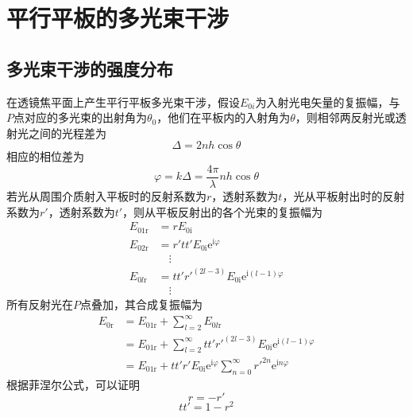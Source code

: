 \documentclass[cn,10pt,chinesefont=founder,math=mtpro2,cite=super,toc=onecol,twoside,openany]{elegantbook}
\begin{document}
\section{平行平板的多光束干涉}

\subsection{多光束干涉的强度分布}
在透镜焦平面上产生平行平板多光束干涉，假设$E_{0i}$为入射光电矢量的复振幅，与$P$点对应的多光束的出射角为$\theta_0$，他们在平板内的入射角为$\theta$，则相邻两反射光或透射光之间的光程差为
\begin{equation}
\varDelta=2nh\cos\theta
\end{equation}
相应的相位差为
\begin{equation}
\varphi=k\varDelta=\frac{4\pi}{\lambda}nh\cos\theta
\label{eq:phase-difference-between-two-beams}
\end{equation}
若光从周围介质射入平板时的反射系数为$r$，透射系数为$t$，光从平板射出时的反射系数为$r'$，透射系数为$t'$，则从平板反射出的各个光束的复振幅为
\begin{equation}
\begin{aligned}
E_{01\mathrm{r}}&=rE_{0\mathrm{i}}\\
E_{02\mathrm{r}}&=r'tt'E_{0\mathrm{i}}\mathrm{e}^{\mathrm{i}\varphi}\\
&\quad\vdots\\
E_{0l\mathrm{r}}&=tt'r'^{(2l-3)}E_{0\mathrm{i}}\mathrm{e}^{\mathrm{i}(l-1)\varphi}\\
&\quad\vdots
\end{aligned}
\end{equation}
所有反射光在$P$点叠加，其合成复振幅为
\begin{equation}
\begin{aligned}
E_{0\mathrm{r}}&=E_{01\mathrm{r}}+\sum_{l=2}^{\infty}E_{0l\mathrm{r}}\\
&=E_{01\mathrm{r}}+\sum_{l=2}^{\infty}tt'r'^{(2l-3)}E_{0\mathrm{i}}\mathrm{e}^{\mathrm{i}(l-1)\varphi}\\
&=E_{01\mathrm{r}}+tt'r'E_{0\mathrm{i}}\mathrm{e}^{\mathrm{i}\varphi}\sum_{n=0}^{\infty}r'^{2n}\mathrm{e}^{\mathrm{i}n\varphi}
\end{aligned}
\end{equation}
根据菲涅尔公式，可以证明
\begin{equation}
r=-r'
\end{equation}
\begin{equation}
tt'=1-r^2
\end{equation}
\end{document}

